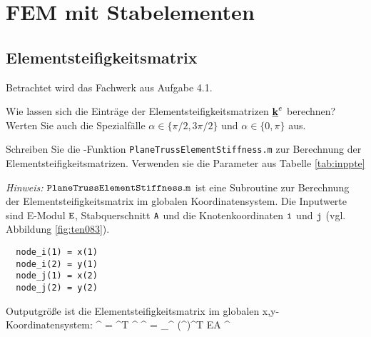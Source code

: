 \clearpage
\setcounter{page}{1}

\section{FEM mit Stabelementen}



\subsection{Elementsteifigkeitsmatrix\label{subsec:stabke}}

Betrachtet wird das Fachwerk aus Aufgabe 4.1.\medskip

\begin{minipage}[b]{0.4\textwidth}
  
\end{minipage}
 \hfill
\begin{minipage}[b]{0.56\textwidth}
  
 \end{minipage}
 
\enab
 \item Wie lassen sich die Einträge der Elementsteifigkeitsmatrizen $\underline{{\bm{\mathrm{k}}}}^e$ berechnen? \\
   Werten Sie auch die Spezialfälle $\alpha\in\{\pi / 2, 3\pi /2\} $ und $\alpha\in\{0,\pi\}$ aus.
 \item Schreiben Sie die \matl-Funktion {\tt PlaneTrussElementStiffness.m} zur Berechnung der Elementsteifigkeitsmatrizen. 
   Verwenden sie die Parameter aus Tabelle \ref{tab:inppte}
\enae

\textit{Hinweis:}
$\tt PlaneTrussElementStiffness.m$ ist eine Subroutine zur Berechnung der Elementsteifigkeitsmatrix im globalen Koordinatensystem.
Die Inputwerte sind E-Modul $\tt E$, Stabquerschnitt $\tt A$ und die Knotenkoordinaten $\tt i$ und $\tt j$ (vgl. Abbildung \ref{fig:ten083}).
\begin{verbatim} 
  node_i(1) = x(1) 
  node_i(2) = y(1)  
  node_j(1) = x(2) 
  node_j(2) = y(2)  
\end{verbatim} 

Outputgröße ist die Elementsteifigkeitsmatrix im globalen x,y-Koordinatensystem:
  \ebn
  \mk^ = \mT^T \; \tilde{\mk} {}^ \; \underline \bT
  \quad {} \quad 
  \tilde{\mk} {}^ = \int_{\B^} (\mB^)^T EA \; \mB^{} \;  
  \een

